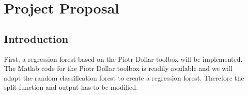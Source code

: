 %





\newcommand{\TUGn}{Graz University of Technology}

\address[ICG]{Inst. for Computer Graphics and Vision \\ \TUGn, Austria}



















\begin{abstract}








\end{abstract}


\section{Project Proposal}

\subsection{Introduction} %
\label{sub:intro}
First, a regression forest based on the Piotr Dollar toolbox \cite{piotr} will be implemented. The Matlab code for the Piotr Dollar toolbox is readily available and we will adapt the random classification forest to create a regression forest. Therefore the split function and output has to be modified.

